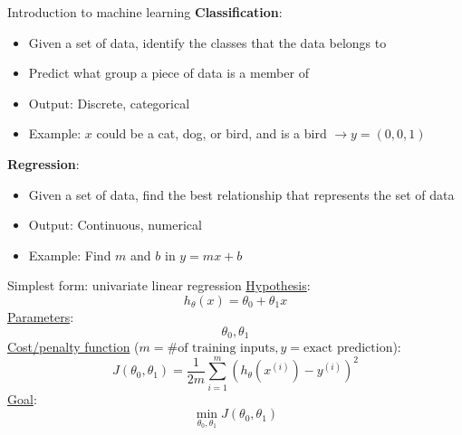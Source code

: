 \documentclass[compress]{beamer}
\begin{document}
\begin{frame}{Introduction to machine learning}
  \textbf{Classification}:
  \begin{itemize}
  \item Given a set of data, identify the classes that the data belongs to
  \item Predict what group a piece of data is a member of
  \item Output: Discrete, categorical
  \item Example: \(x\) could be a cat, dog, or bird, and is a bird \(\rightarrow y = (0, 0, 1)\)
  \end{itemize}
  \textbf{Regression}:
  \begin{itemize}
  \item Given a set of data, find the best relationship that represents the set of data
  \item Output: Continuous, numerical
  \item Example: Find \(m\) and \(b\) in \(y=mx+b\)
  \end{itemize}
\end{frame}

\begin{frame}{Simplest form: univariate linear regression}
  \underline{Hypothesis}:
  \begin{equation*}
    h_{\theta}(x) = \theta_0 + \theta_1 x
  \end{equation*}
  \underline{Parameters}:
  \begin{equation*}
    \theta_{0}, \theta_{1}
  \end{equation*}
  \underline{Cost/penalty function} (\(m = \text{\# of training inputs}, y = \text{exact prediction}\)):
  \begin{equation*}
    J(\theta_{0}, \theta_{1}) = \frac{1}{2m} \sum_{i=1}^{m} \left( h_{\theta}(x^{(i)}) - y^{(i)} \right)^2
  \end{equation*}
  \underline{Goal}:
  \begin{equation*}
    \min_{\theta_{0}, \theta_{1}} J(\theta_{0}, \theta_{1})
  \end{equation*}
\end{frame}
\end{document}
